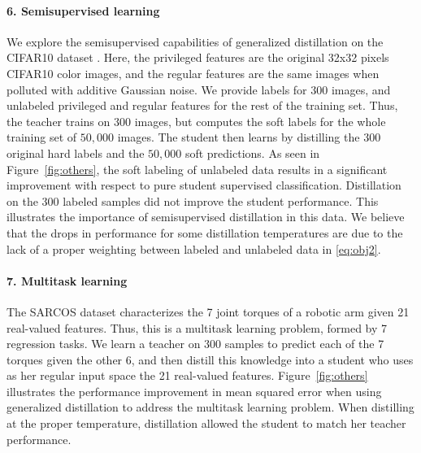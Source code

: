 \documentclass{article}
\begin{document}
\paragraph{6. Semisupervised learning} We explore the semisupervised capabilities
of generalized distillation on the CIFAR10 dataset \citep{CIFAR10}. Here, the
privileged features are the original 32x32 pixels CIFAR10 color images, and the
regular features are the same images when polluted with additive Gaussian
noise. We provide labels for $300$ images, and unlabeled privileged and regular
features for the rest of the training set. Thus, the teacher trains on $300$
images, but computes the soft labels for the whole training set of $50,000$
images. The student then learns by distilling the $300$ original hard labels
and the $50,000$ soft predictions. As seen in Figure~\ref{fig:others}, the soft
labeling of unlabeled data results in a significant improvement with respect to
pure student supervised classification. Distillation on the $300$ labeled
samples did not improve the student performance. This illustrates the
importance of semisupervised distillation in this data.  We believe that the
drops in performance for some distillation temperatures are due to the lack of
a proper weighting between labeled and unlabeled data in \eqref{eq:obj2}.

\paragraph{7. Multitask learning} The SARCOS
dataset \citep{SARCOS} characterizes the 7 joint torques of a robotic arm given
21 real-valued features.  Thus, this is a multitask learning problem, formed by
7 regression tasks. We learn a teacher on $300$ samples to predict each of the
7 torques given the other 6, and then distill this knowledge into a student who
uses as her regular input space the 21 real-valued features.
Figure~\ref{fig:others} illustrates the performance improvement in mean squared
error when using generalized distillation to address the multitask learning
problem. When distilling at the proper temperature, distillation allowed
the student to match her teacher performance.  
\end{document}
